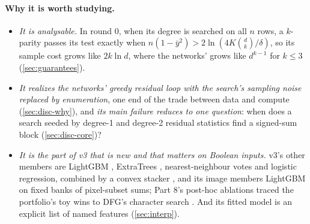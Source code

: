 \paragraph{Why it is worth studying.}
\begin{itemize}
\item \emph{It is analysable.} In round 0, when its degree is searched on all $n$ rows, a $k$-parity passes its test exactly when $n(1-\bar y^2)>2\ln(4K\binom dk/\delta)$, so its sample cost grows like $2k\ln d$, where the networks' grows like $d^{k-1}$ for $k\le3$ (\cref{sec:guarantees}).
\item \emph{It realizes the networks' greedy residual loop with the search's sampling noise replaced by enumeration}, one end of the trade between data and compute (\cref{sec:disc-why}), and \emph{its main failure reduces to one question}: when does a search seeded by degree-1 and degree-2 residual statistics find a signed-sum block (\cref{sec:disc-core})?
\item \emph{It is the part of v3 that is new and that matters on Boolean inputs.} v3's other members are LightGBM \cite{ke2017lightgbm}, ExtraTrees \cite{geurts2006extremely}, nearest-neighbour votes and logistic regression, combined by a convex stacker \cite{wolpert1992stacked}, and its image members LightGBM on fixed banks of pixel-subset sums; Part 8's post-hoc ablations traced the portfolio's toy wins to DFG's character search \cite{discretelearners2026,portfoliolearner2026}. And its fitted model is an explicit list of named features (\cref{sec:interp}).
\end{itemize}

\begin{table}[tbp]
\centering\footnotesize\renewcommand{\arraystretch}{1.0}

\caption{The results at a glance . A ratio is $\log_2(\nstar_{\rm DFG}/\nstar_{\rm ref})$ (for  and the core, of theirs to the reference's), negative when the first needs less data; means are over the targets both learn. ``Clearly'': beyond $\pm0.25$, or only one of the two reaches 10\% error; on tabular data, errors that differ by more than 10\% and 2 s.e.\ (\cref{sec:metrics}). The s.d.\ and s.e.\ on  are over its 11 learned targets, as independent draws from the family. Only  is held out for DFG v1.3. Generated by  (\texttt{tab\_headline}) from  and  (the core's FLOPs).}
\label{tab:headline}
\end{table}

